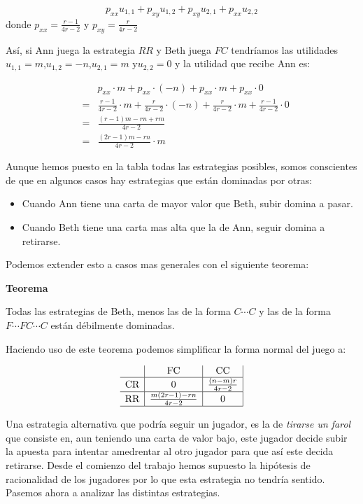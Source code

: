 \documentclass[12pt,a4paper,]{book}
\numberwithin{dummy}{section}
\theoremstyle{ocrenumbox}
\theoremstyle{blacknumex}
\theoremstyle{blacknumbox}
\theoremstyle{ocrenum}
\theoremstyle{ocrenum}
\begin{document}
\[
p_{xx}u_{1,1} + p_{xy}u_{1,2} + p_{xy}u_{2,1} + p_{xx}u_{2,2}
\] donde \(p_{xx}=\frac{r-1}{4r-2}\) y \(p_{xy}=\frac{r}{4r-2}\)

Así, si Ann juega la estrategia \(RR\) y Beth juega \(FC\) tendríamos
las utilidades \(u_{1,1}=m\),\(u_{1,2}=-n\),\(u_{2,1}=m\) y\(u_{2,2}=0\)
y la utilidad que recibe Ann es:

\[
\begin{array}{ccl}
 &  & p_{xx}·m + p_{xx}·(-n) + p_{xx}·m + p_{xx}·0 \\
        & = & \frac{r-1}{4r-2}·m +\frac{r}{4r-2}·(-n) + \frac{r}{4r-2}·m +\frac{r-1}{4r-2}·0 \\
        & = & \frac{(r-1)m - rn +rm}{4r-2} \\
        & = & \frac{(2r-1)m-rn}{4r-2}·m
\end{array}
\]

Aunque hemos puesto en la tabla todas las estrategias posibles, somos
conscientes de que en algunos casos hay estrategias que están dominadas
por otras:

\begin{itemize}
\item
  Cuando Ann tiene una carta de mayor valor que Beth, subir domina a
  pasar.
\item
  Cuando Beth tiene una carta mas alta que la de Ann, seguir domina a
  retirarse.
\end{itemize}

Podemos extender esto a casos mas generales con el siguiente teorema:

\textbf{Teorema}

Todas las estrategias de Beth, menos las de la forma \(C \cdots C\) y
las de la forma \(F \cdots FC \cdots C\) están débilmente dominadas.

Haciendo uso de este teorema podemos simplificar la forma normal del
juego a:

\[
\begin{array}{c|c|c|}
 & \text{FC} & \text{CC} \\
\hline
\text{CR} & 0  & \frac{(n-m)r}{4r-2} \\
\hline
\text{RR} & \frac{m(2r-1)-rn}{4r-2}  & 0 \\
\hline
\end{array}
\]

Una estrategia alternativa que podría seguir un jugador, es la de
\emph{tirarse un farol} que consiste en, aun teniendo una carta de valor
bajo, este jugador decide subir la apuesta para intentar amedrentar al
otro jugador para que así este decida retirarse. Desde el comienzo del
trabajo hemos supuesto la hipótesis de racionalidad de los jugadores por
lo que esta estrategia no tendría sentido. Pasemos ahora a analizar las
distintas estrategias.
\end{document}
